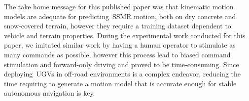 The take home message for this published paper was that kinematic motion models are adequate for predicting~\ac{SSMR} motion, both on dry concrete and snow-covered terrain, however they require a training dataset dependent to vehicle and terrain properties.
During the experimental work conducted for this paper, we imitated similar work by having a human operator to stimulate as many commands as possible, however this process lead to biased command stimulation and forward-only driving and proved to be time-consuming.
Since deploying~\acp{UGV} in off-road environments is a complex endeavor, reducing the time requiring to generate a motion model that is accurate enough for stable autonomous navigation is key.

\begin{center}
	\textbf{}
\end{center}

